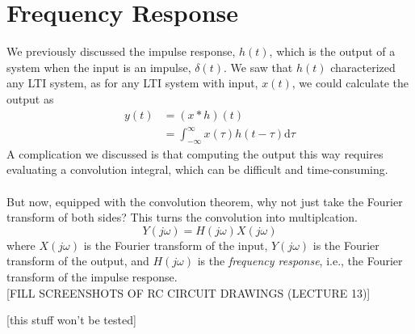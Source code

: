\documentclass[10pt]{article}
\newcommand{\absint}{\int_{-\infty}^\infty}
\newcommand{\dd}{\text{d}}
\begin{document}
\section*{Frequency Response}
We previously discussed the impulse response, $h(t)$, which is the output of a system when the input is an impulse, $\delta(t)$.  We saw that $h(t)$ characterized any LTI system, as for any LTI system with input, $x(t)$, we could calculate the output as 
\begin{align*}
    y(t) &= (x * h)(t)\\
    &= \absint x(\tau) h(t - \tau) \dd \tau
\end{align*}
A complication we discussed is that computing the output this way requires evaluating a convolution integral, which can be difficult and time-consuming.\\\\
But now, equipped with the convolution theorem, why not just take the Fourier transform of both sides?  This turns the convolution into multiplcation.
\[Y(j\omega) = H(j\omega)X(j\omega)\]
where $X(j\omega)$ is the Fourier transform of the input, $Y(j\omega)$ is the Fourier transform of the output, and $H(j\omega)$ is the \textit{frequency response}, i.e., the Fourier transform of the impulse response.\\

[FILL SCREENSHOTS OF RC CIRCUIT DRAWINGS (LECTURE 13)]

[this stuff won't be tested]
\end{document}

